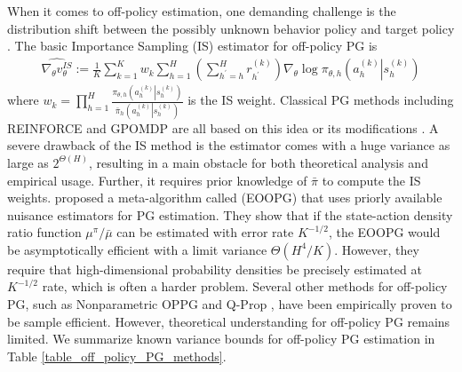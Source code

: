 \documentclass{article}
\numberwithin{equation}{section}
\begin{document}
When it comes to off-policy estimation, one demanding challenge is the distribution shift between the possibly unknown behavior policy and target policy \cite{agarwal2021theory}. 
The basic Importance Sampling (IS) estimator for off-policy PG is
\begin{align*}
    \widehat{\nabla_\theta v_\theta^{IS}}:=\frac{1}{K}\sum_{k=1}^K w_k\sum_{h=1}^H \left(\sum_{h^\prime =h}^H r_{h^\prime}^{(k)}\right)\nabla_\theta\log\pi_{\theta, h}\left(\left. a_h^{(k)}\right\vert s_h^{(k)}\right)
\end{align*}
where $w_k=\prod_{h=1}^H \frac{\pi_{\theta, h}\left(\left.a_h^{(k)}\right\vert s_h^{(k)}\right)}{\bar \pi_h\left(\left.a_h^{(k)}\right\vert s_h^{(k)}\right)}$ is the IS weight. %
Classical PG methods including REINFORCE and GPOMDP \cite{sutton2000policy, williams1992simple} are all based on this idea or its modifications \cite{degris2012off, kakade2001natural, peters2008natural}.
A severe drawback of the IS method is the estimator comes with a huge variance as large as $2^{\Theta(H)}$, resulting in a main obstacle for both theoretical analysis and empirical usage. Further, it requires prior knowledge of $\bar{\pi}$ to compute the IS weights.
\cite{kallus2020statistically} proposed a meta-algorithm called (EOOPG) that uses priorly available nuisance estimators for PG estimation. They show that if the state-action density ratio function $\mu^{\pi}/\bar\mu$ can be estimated with error rate $K^{-1/2}$, the EOOPG would be asymptotically efficient with a limit variance $\Theta(H^4/K).$ However, they require that high-dimensional probability densities be precisely estimated at $K^{-1/2}$ rate, which is often a harder problem. Several other methods for off-policy PG, such as Nonparametric OPPG \cite{tosatto2020nonparametric} and Q-Prop \cite{gu2016q}, have been empirically proven to be sample efficient. However, theoretical understanding for off-policy PG remains limited. We summarize known variance bounds for off-policy PG estimation in Table \ref{table_off_policy_PG_methods}.
\end{document}
